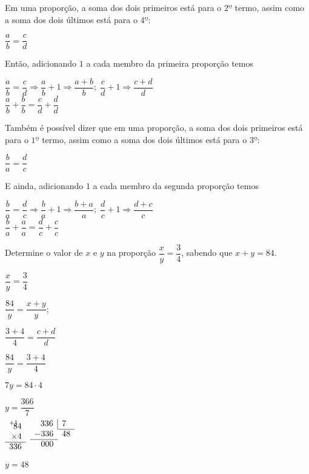\begin{enumerate}
Em uma proporção, a soma dos dois primeiros está para o $ 2º $ termo, assim como a soma dos dois últimos está para o $ 4º $:


$ \dfrac{a}{b} = \dfrac{c}{d} $

Então, adicionando $ 1 $ a cada membro da primeira proporção temos

$ \dfrac{a}{b} = \dfrac{c}{d} \Rightarrow \dfrac{a}{b} + 1 \Rightarrow \dfrac{a+b}{b}; \; \dfrac{c}{d} + 1 \Rightarrow \dfrac{c+d}{d}$\\

$ \dfrac{a}{b} + \dfrac{b}{b} = \dfrac{c}{d} + \dfrac{d}{d}$

Também é possível dizer que em uma proporção, a soma dos dois primeiros está para o $ 1º $ termo, assim como a soma dos dois últimos está para o $ 3º $:

$ \dfrac{b}{a} = \dfrac{d}{c} $

E ainda, adicionando $ 1 $ a cada membro da segunda proporção temos

$ \dfrac{b}{a} = \dfrac{d}{c} \Rightarrow \dfrac{b}{a} + 1 \Rightarrow \dfrac{b+a}{a}; \; \dfrac{d}{c} + 1 \Rightarrow \dfrac{d+c}{c}$\\

$ \dfrac{b}{a} + \dfrac{a}{a} = \dfrac{d}{c} + \dfrac{c}{c}$

Determine o valor de $ x $ e $ y $ na proporção $ \dfrac{x}{y} = \dfrac{3}{4} $, sabendo que $ x+y = 84 $.

\begin{multicols}{5}
	$ \dfrac{x}{y} = \dfrac{3}{4}$

	\columnbreak
	$\dfrac{84}{y} = \dfrac{x+y}{y};$
		
	$ \dfrac{3+4}{4} = \dfrac{c+d}{d}$
	
	\columnbreak
	$ \dfrac{84}{y} = \dfrac{3+4}{4} $
	
	$ 7y = 84 \cdot 4 $
	
	$ y = \dfrac{366}{7} $\\
	\columnbreak
	$
	\begin{array}{r r}
	\multicolumn{2}{l}{_{+1}} \vspace*{-5.5pt} \\
	\multicolumn{2}{r}{84} \\ 
	\multicolumn{2}{r}{\times4} \\ \cline{1-2}
	\multicolumn{2}{r}{336} \\
	\end{array}
	$
	\columnbreak
		$
	\begin{array}{r r r r}
	\multicolumn{2}{r}{336} \vline & \multicolumn{2}{l}{7} \\ \cline{3-4}
	\multicolumn{2}{l}{-336} & \multicolumn{2}{l}{48} \\ \cline{1-2}
	\multicolumn{2}{r}{000} &  \\
	\end{array}
	$
\end{multicols}
$ y = 48 $


\end{enumerate}
